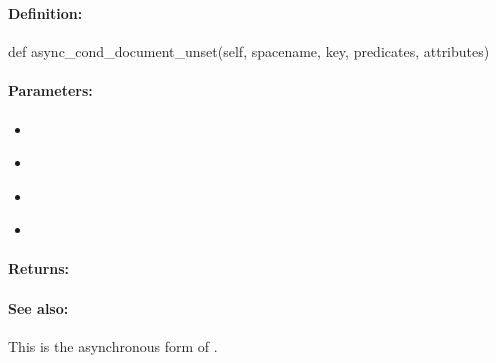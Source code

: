\pagebreak
\subsubsection{}
\label{api:python:async_cond_document_unset}


\paragraph{Definition:}
\begin{pythoncode}
def async_cond_document_unset(self, spacename, key, predicates, attributes)
\end{pythoncode}

\paragraph{Parameters:}
\begin{itemize}[noitemsep]
\item {}\\

\item {}\\

\item {}\\

\item {}\\

\end{itemize}

\paragraph{Returns:}


\paragraph{See also:}  This is the asynchronous form of .

\pagebreak
\subsubsection{}
\label{api:python:group_document_unset}


